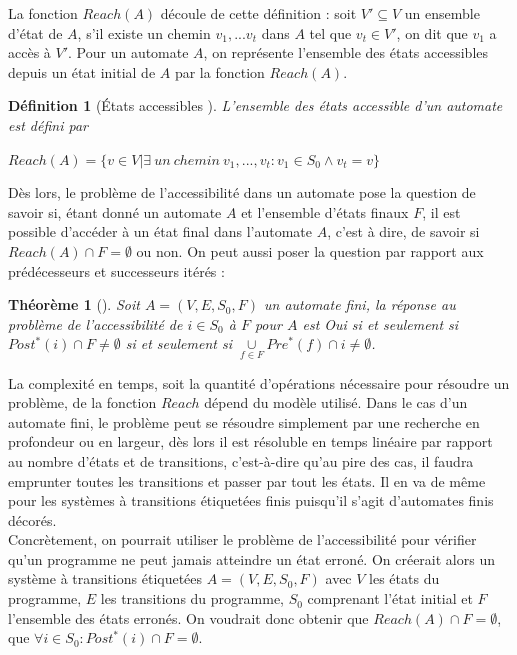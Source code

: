 \documentclass[a4paper]{report}
\theoremstyle{break}
\newtheorem{defin}{Définition}
\newtheorem{theo}{Théorème}
\begin{document}
La fonction $Reach(A)$ découle de cette définition : soit $V' \subseteq V$ un ensemble d'état de $A$, s'il existe un chemin $v_1,...v_t$ dans $A$ tel que $v_t \in V'$, on dit que $v_1$ a accès à $V'$. Pour un automate $A$, on représente l'ensemble des états accessibles depuis un état initial de $A$ par la fonction $Reach(A)$.

\begin{defin}[États accessibles \cite{geeraerts2013multiprocessor}]
L'ensemble des états accessible d'un automate est défini par 
\begin{center}
$Reach(A) = \{v \in V | \exists\ un\ chemin\ v_1,...,v_t : v_1 \in S_0 \wedge v_t = v\}$
\end{center}
\end{defin}

Dès lors, le problème de l'accessibilité dans un automate pose la question de savoir si, étant donné un automate $A$ et l'ensemble d'états finaux $F$, il est possible d'accéder à un état final dans l'automate $A$, c'est à dire, de savoir si $Reach(A) \cap F = \emptyset$ ou non. On peut aussi poser la question par rapport aux prédécesseurs et successeurs itérés :

\begin{theo}[\cite{doyen2010antichain}]
Soit $A = (V,E,S_0,F)$ un automate fini, la réponse au problème de l'accessibilité de $i \in S_0$ à $F$ pour $A$ est Oui si et seulement si $Post^*(i) \cap F \neq \emptyset$ si et seulement si $\underset{f \in F}{\cup}Pre^*(f) \cap i \neq \emptyset$.
\end{theo}

La complexité en temps, soit la quantité d'opérations nécessaire pour résoudre un problème, de la fonction $Reach$ dépend du modèle utilisé. Dans le cas d'un automate fini, le problème peut se résoudre simplement par une recherche en profondeur ou en largeur, dès lors il est résoluble en temps linéaire par rapport au nombre d'états et de transitions, c'est-à-dire qu'au pire des cas, il faudra emprunter toutes les transitions et passer par tout les états. Il en va de même pour les systèmes à transitions étiquetées finis puisqu'il s'agit d'automates finis décorés.\\

Concrètement, on pourrait utiliser le problème de l'accessibilité pour vérifier qu'un programme ne peut jamais atteindre un état erroné. On créerait alors un système à transitions étiquetées $A = (V, E, S_0, F)$ avec $V$ les états du programme, $E$ les transitions du programme, $S_0$ comprenant l'état initial et $F$ l'ensemble des états erronés. On voudrait donc obtenir que $Reach(A) \cap F = \emptyset$, que $\forall i \in S_0 : Post^*(i) \cap F = \emptyset$.
\end{document}
